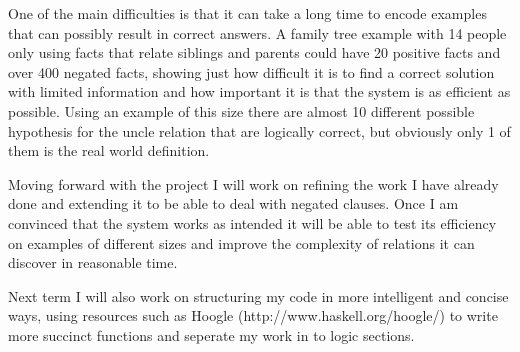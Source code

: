 \documentclass{article}
\begin{document}
One of the main difficulties is that it can take a long time to encode examples
that can possibly result in correct answers. A family tree example with 14
people only using facts that relate siblings and parents could have 20 positive
facts and over 400 negated facts, showing just how difficult it is to find a
correct solution with limited information and how important it is that the
system is as efficient as possible. Using an example of this size there are 
almost 10 different possible hypothesis for the uncle relation that are
logically correct, but obviously only 1 of them is the real world definition.

Moving forward with the project I will work on refining the work I have already
done and extending it to be able to deal with negated clauses. Once I am
convinced that the system works as intended it will be able to test its
efficiency on examples of different sizes and improve the complexity of relations
it can discover in reasonable time.

Next term I will also work on structuring my code in more intelligent and concise ways,
using resources such as Hoogle (http://www.haskell.org/hoogle/) to write more succinct
functions and seperate my work in to logic sections.



\end{document}
